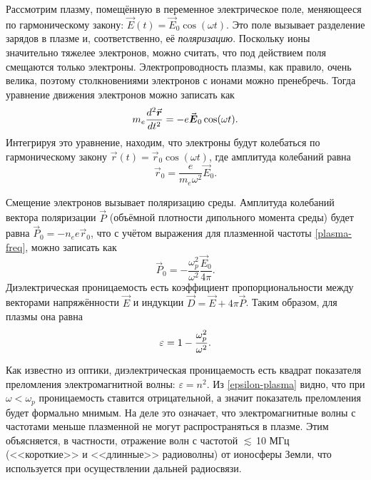 Рассмотрим плазму, помещённую в переменное электрическое поле, меняющееся
по гармоническому закону: $\vec{E}(t)=\vec{E}_0 \cos (\omega t)$. 
Это поле вызывает разделение зарядов в плазме и, соответственно, её \emph{поляризацию}.
Поскольку ионы значительно тяжелее электронов, можно считать, что
под действием поля смещаются только электроны. Электропроводность
плазмы, как правило, очень велика, поэтому столкновениями электронов
с ионами можно пренебречь. Тогда уравнение движения электронов можно записать как
\begin{equation}
\eqmark{free_E}
m_e \frac{d^2 \vec{r}}{dt^2} = - e \vec{E}_0 \cos(\omega t).
\end{equation}
Интегрируя это уравнение, находим, что электроны будут колебаться по 
гармоническому закону
$\vec{r}(t) = \vec{r}_0 \cos(\omega t)$, где амплитуда колебаний равна
\[
\vec{r}_0 = \frac{e}{m_e\omega^2} \vec{E}_0.
\]

Смещение электронов вызывает поляризацию среды. Амплитуда колебаний 
вектора поляризации $\vec{P}$ (объёмной плотности дипольного момента среды) будет равна
$\vec{P}_0 = -n_e e \vec{r}_0$, что 
с учётом выражения для плазменной частоты \eqref{plasma-freq},
можно записать как
\[
\vec{P}_0 = -\frac{\omega_p^2}{\omega^2} \frac{\vec{E}_0}{4\pi}.
\]
Диэлектрическая проницаемость есть коэффициент пропорциональности
между векторами напряжённости $\vec{E}$ и индукции $\vec{D}=\vec{E}+4\pi \vec{P}$.
Таким образом, для плазмы она равна
\begin{equation}
\eqmark{epsilon-plasma}
\varepsilon = 1 - \frac{\omega_p^2}{\omega^2}.
\end{equation}


\begin{lab:example}
Как известно из оптики, диэлектрическая проницаемость есть
квадрат показателя преломления электромагнитной волны: $\varepsilon=n^2$.
Из \eqref{epsilon-plasma} видно, что при $\omega<\omega_p$ проницаемость
ставится отрицательной, а значит показатель преломления будет формально мнимым.
 На деле это означает, что электромагнитные волны с частотами меньше плазменной
 не могут распространяться в плазме. Этим объясняется, в частности, 
 отражение волн с частотой $\lesssim$\,10 МГц (<<короткие>> и <<длинные>> радиоволны) 
 от ионосферы Земли, что используется при осуществлении дальней радиосвязи.
\end{lab:example}


\label{sec:zonds}

